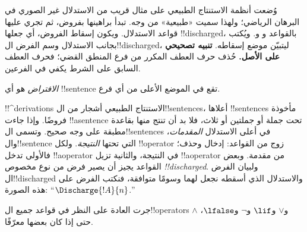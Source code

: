 \documentclass[../../../include/open-logic-section]{subfiles}
\begin{document}
      {}
      {}


\begin{explain}
وُضعت أنظمة الاستنتاج الطبيعي على مثال قريب من الاستدلال غير الصوري في البرهان الرياضي؛ ولهذا سميت «طبيعية» من وجه.
تبدأ براهينها بفروض، ثم تجري عليها قواعد الاستدلال.
ويكون إسقاط الفروض، أي جعلها !!{discharged}، بالقواعد
\Intro{\lnot} و\Intro{\lif} و.
ويُكتب بجانب الاستدلال وسم الفرض ال!!{discharged}، ليتبيّن موضع إسقاطه.
\textbf{تنبيه تصحيحي على الأصل.} حُذف حرف العطف المكرر من فرع المنطق
القضي؛ فحرف العطف السابق على الشرط يكفي في الفرعين.
\end{explain}

\begin{defn}[الافتراض]
\emph{الافتراض} هو أي !!{sentence} تقع في الموضع الأعلى من أي فرع.
\end{defn}

!!^{derivation}s الاستنتاج الطبيعي أشجار من ال!!{sentence}s، أعلاها
!!{sentence}s مأخوذة فروضًا. وإذا جاءت !!a{sentence} تحت جملة أو جملتين أو ثلاث، فلا بد أن تنتج منها بقاعدة مطبقة على وجه صحيح.
وتسمى ال!!{sentence}s في أعلى الاستدلال \emph{المقدمات}، وال!!{sentence} التي تحتها \emph{النتيجة}.
ولكل !!{operator} زوج من القواعد: إدخال وحذف؛ فالأولى تدخل
!!a{operator} في النتيجة، والثانية تزيل !!a{operator} من مقدمة.
وبعض القواعد يجيز أن يصير فرض من نوع مخصوص \emph{!!{discharged}}.
ولبيان الفرض ال!!{discharged} والاستدلال الذي أسقطه نجعل لهما وسومًا متوافقة، فنكتب الفرض على هذه الصورة:
``$\Discharge{!A}{n}$.''


%
	{جرت العادة على النظر في قواعد جميع ال!!{operator}s $\land$ و$\lor$ و$\lif$ و$\lnot$ و$\lfalse$، حتى إذا كان بعضها معرّفًا.}
\end{document}
